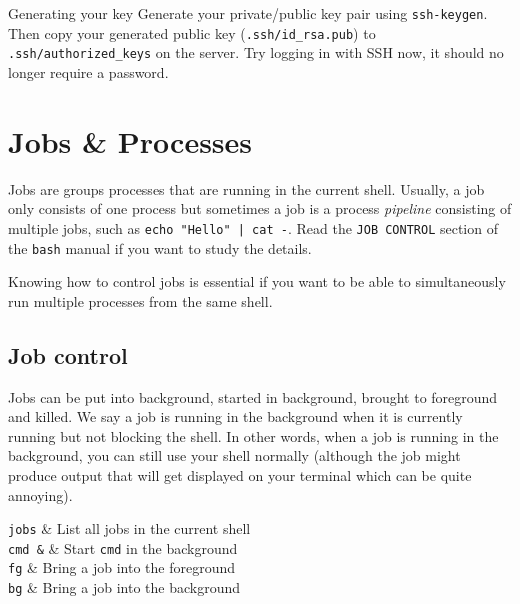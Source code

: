 \documentclass{TheAlternativeCourse}
\begin{document}
\begin{exercisebox}{Generating your key}
    Generate your private/public key pair using \texttt{ssh-keygen}.
    Then copy your generated public key (\texttt{.ssh/id\_rsa.pub}) to
    \texttt{.ssh/authorized\_keys} on the server. Try logging in with SSH now,
    it should no longer require a password.
\end{exercisebox}


\section{Jobs \& Processes}

Jobs are groups processes that are running in the current shell. Usually, a job
only consists of one process but sometimes a job is a process \emph{pipeline}
consisting of multiple jobs, such as \texttt{echo "Hello" | cat -}. Read the
\texttt{JOB CONTROL} section of the \texttt{bash} manual if you want to study
the details.

Knowing how to control jobs is essential if you want to be able to
simultaneously run multiple processes from the same shell.

\subsection{Job control}

Jobs can be put into background, started in background, brought to foreground
and killed. We say a job is running in the background when it is currently
running but not blocking the shell. In other words, when a job is running in
the background, you can still use your shell normally (although the job might
produce output that will get displayed on your terminal which can be quite
annoying).

\begin{table}[H]
    \centering
    \begin{tcolorbox}[%
        enhanced,
        fuzzy shadow={1mm}{-1mm}{0mm}{0.1mm}{black!50!white},
        width=1.0\linewidth,
        tabularx={>{\centering\arraybackslash}l|>{\centering\arraybackslash}X},
        title={Working with jobs}]
	    \texttt{jobs} & List all jobs in the current shell\\
	    \texttt{cmd \&} & Start \texttt{cmd} in the background\\
	    \texttt{fg} & Bring a job into the foreground\\
	    \texttt{bg} & Bring a job into the background\\
    \end{tcolorbox}
    \label{tabjobcmds}
\end{table}
\end{document}
